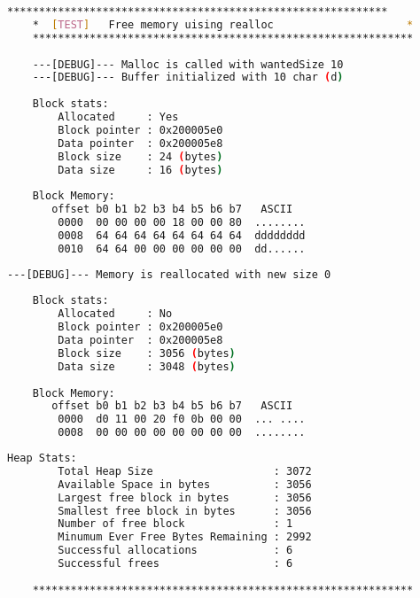     \begin{outputbox}
    \begin{lstlisting}[language=bash]
    ************************************************************
    *  [TEST]   Free memory uising realloc                     *
    ************************************************************
        
    ---[DEBUG]--- Malloc is called with wantedSize 10
    ---[DEBUG]--- Buffer initialized with 10 char (d)
    
    Block stats:
        Allocated     : Yes
        Block pointer : 0x200005e0
        Data pointer  : 0x200005e8
        Block size    : 24 (bytes)
        Data size     : 16 (bytes)
    
    Block Memory:
       offset b0 b1 b2 b3 b4 b5 b6 b7   ASCII
        0000  00 00 00 00 18 00 00 80  ........
        0008  64 64 64 64 64 64 64 64  dddddddd
        0010  64 64 00 00 00 00 00 00  dd......
    \end{lstlisting}
    \end{outputbox}

    \begin{outputbox}
    \begin{lstlisting}[language=bash]
    ---[DEBUG]--- Memory is reallocated with new size 0
    
    Block stats:
        Allocated     : No
        Block pointer : 0x200005e0
        Data pointer  : 0x200005e8
        Block size    : 3056 (bytes)
        Data size     : 3048 (bytes)
    
    Block Memory:
       offset b0 b1 b2 b3 b4 b5 b6 b7   ASCII
        0000  d0 11 00 20 f0 0b 00 00  ... ....
        0008  00 00 00 00 00 00 00 00  ........
    \end{lstlisting}
    \end{outputbox}

    \begin{outputbox}
    \begin{lstlisting}[language=bash]   
    Heap Stats:
        Total Heap Size                   : 3072
        Available Space in bytes          : 3056
        Largest free block in bytes       : 3056
        Smallest free block in bytes      : 3056
        Number of free block              : 1
        Minumum Ever Free Bytes Remaining : 2992
        Successful allocations            : 6
        Successful frees                  : 6
    
    ************************************************************
    \end{lstlisting}
    \end{outputbox}

